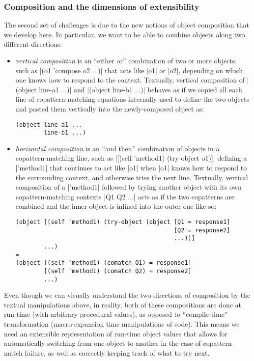 \subsubsection{Composition and the dimensions of extensibility}
\label{sec:composition-challenges}

The second set of challenges is due to the new notions of object composition that we develop here.
In particular, we want to be able to combine objects along two different directions:
\begin{itemize}
\item
  \emph{vertical composition} is an ``either or'' combination of two or more objects, such as \scm|(o1 'compose o2 ...)| that acts like \scm|o1| or \scm|o2|, \etc[,] depending on which one knows how to respond to the context.
  Textually, vertical composition of \scm|(object line-a1 ...)| and \scm|(object line-b1 ...)| behaves as if we copied all each line of copattern-matching equations internally used to define the two objects and pasted them vertically into the newly-composed object as:
\begin{verbatim}
(object line-a1 ...
        line-b1 ...)
\end{verbatim}
\item
  \emph{horizontal composition} is an ``and then'' combination of objects in a copattern-matching line, such as \scm|[(self 'method1) (try-object o1)]| defining a \scm|'method1| that continues to act like \scm|o1| when \scm|o1| knows how to respond to the surrounding context, and otherwise tries the next line.
  Textually, vertical composition of a \scm|'method1| followed by trying another object with its own copattern-matching contexts \scm|Q1 Q2 ...| acts as if the two copatterns are combined and the inner object is inlined into the outer one like so:
\begin{verbatim}
(object [(self 'method1) (try-object (object [Q1 = response1]
                                             [Q2 = response2]
                                             ...))]
        ...)
=
(object [(self 'method1) (comatch Q1) = response1]
        [(self 'method1) (comatch Q2) = response2]
        ...)
\end{verbatim}
\end{itemize}

Even though we can visually understand the two directions of composition by the textual manipulations above, in reality, both of these compositions are done at run-time (\ie with arbitrary procedural values), as opposed to ``compile-time'' transformation (\ie macro-expansion time manipulations of code).
This means we need an extensible representation of run-time object values that allows for automatically switching from one object to another in the case of copattern-match failure, as well as correctly keeping track of what to try next.

